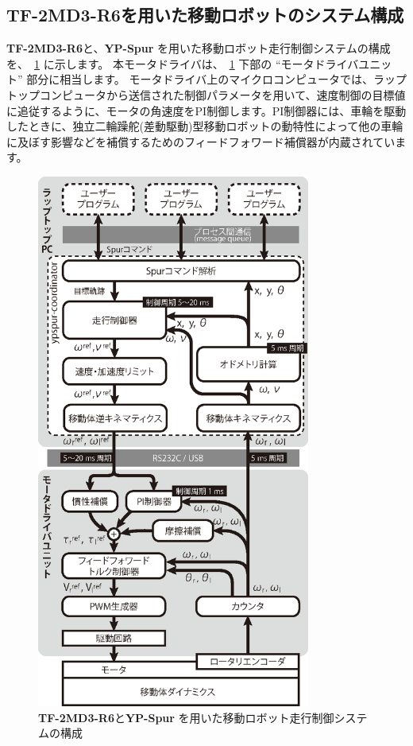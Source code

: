 \documentclass[11pt,a4j,openany,fleqn]{jbook}
\begin{document}
\newpage
\subsection{{\bf TF-2MD3-R6}を用いた移動ロボットのシステム構成}
\label{sec:システム構成}

{\bf TF-2MD3-R6}と、{\bf YP-Spur} を用いた移動ロボット走行制御システムの構成を、\figurename~\ref{fig:yp-system} に示します。
本モータドライバは、\figurename~\ref{fig:yp-system} 下部の ``モータドライバユニット'' 部分に相当します。
モータドライバ上のマイクロコンピュータでは、ラップトップコンピュータから送信された制御パラメータを用いて、速度制御の目標値に追従するように、モータの角速度をPI制御します。PI制御器には、車輪を駆動したときに、独立二輪躁舵(差動駆動)型移動ロボットの動特性によって他の車輪に及ぼす影響などを補償するためのフィードフォワード補償器\cite{the:pws_ff_cnt}\cite{the:vehicle_control}が内蔵されています。\par
\begin{figure}[H]
\centering\includegraphics[width=90mm]{system2.eps}
\caption{{\bf TF-2MD3-R6}と{\bf YP-Spur} を用いた移動ロボット走行制御システムの構成}
\label{fig:yp-system}
\end{figure}
\end{document}
